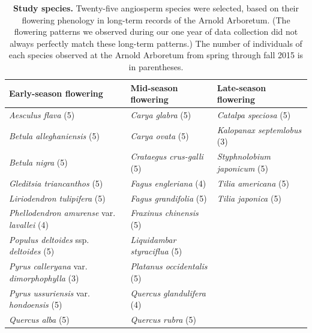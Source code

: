 \documentclass{article}
\begin{document}
\begin{table}[p]
  \caption{\textbf{Study species.} Twenty-five angiosperm species were selected, based on their flowering phenology in long-term records of the Arnold Arboretum. (The flowering patterns we observed during our one year of data collection did not always perfectly match these long-term patterns.) The number of individuals of each species observed at the Arnold Arboretum from spring through fall 2015 is in parentheses.}
\begin{footnotesize} 
   \begin{tabular}{| p{5.5cm} | p{5.5cm} | p{5.5cm} |}
    \hline
  \bf{Early-season flowering} & \bf{Mid-season flowering} & \bf{Late-season flowering} \\ \hline
    \textit{Aesculus flava} (5) & \textit{Carya glabra} (5) & \textit{Catalpa speciosa} (5) \\ 
    \textit{Betula alleghaniensis} (5) & \textit{Carya ovata} (5) & \textit{Kalopanax septemlobus} (3) \\ 
    \textit{Betula nigra} (5) & \textit{Crataegus crus-galli} (5) & \textit{Styphnolobium japonicum} (5) \\ 
\textit{Gleditsia triancanthos} (5) & \textit{Fagus engleriana} (4) & \textit{Tilia americana} (5) \\ 
\textit{Liriodendron tulipifera} (5) & \textit{Fagus grandifolia} (5) & \textit{Tilia japonica} (5) \\ 
\textit{Phellodendron amurense} var. \textit{lavallei} (4) & \textit{Fraxinus chinensis} (5) &\\ \textit{Populus deltoides} ssp. \textit{deltoides} (5) & \textit{Liquidambar styraciflua} (5) & \\ 
\textit{Pyrus calleryana} var. \textit{dimorphophylla} (3) & \textit{Platanus occidentalis} (5) & \\ 
\textit{Pyrus ussuriensis} var. \textit{hondoensis} (5) & \textit{Quercus glandulifera} (4) & \\ \textit{Quercus alba} (5) & \textit{Quercus rubra} (5) &  \\ \hline
     \end{tabular}    
\end{footnotesize} 
    \end{table}
\clearpage
\end{document}
